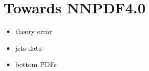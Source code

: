 \chapter{Towards NNPDF4.0}
\label{sec:phenomenology}
\begin{itemize}
    \item theory error
    \item jets data
    \item bottom PDFs
\end{itemize}